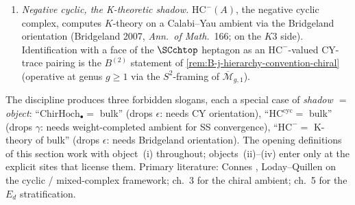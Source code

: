 \begin{remark}
\begin{enumerate}[label=\textup{(\roman*)}]
$=$ bulk is licensed only under the ambient declaration.
\item \emph{Negative cyclic, the K-theoretic shadow.}
$\mathrm{HC}^{-}(A)$, the negative cyclic complex, computes
$K$-theory on a Calabi--Yau ambient via the Bridgeland
orientation (Bridgeland 2007, \emph{Ann.\ of Math.}\ 166;
\cite{BM01} on the $K3$ side). Identification with a face of
the $\SCchtop$ heptagon as an $\mathrm{HC}^-$-valued CY-trace
pairing is the $B^{(2)}$ statement of
\cref{rem:B-j-hierarchy-convention-chiral} (operative at genus
$g \ge 1$ via the $S^2$-framing of
$\overline{\mathcal M}_{g,1}$).
\end{enumerate}
The discipline produces three forbidden slogans, each a special
case of \emph{shadow $=$ object}:
``$\mathrm{ChirHoch}_{\bullet} = $ bulk'' (drops $\epsilon$:
needs CY orientation),
``$\mathrm{HC}^{\mathrm{cyc}} = $ bulk'' (drops $\gamma$: needs
weight-completed ambient for SS convergence),
``$\mathrm{HC}^{-} = $ K-theory of bulk'' (drops $\epsilon$:
needs Bridgeland orientation). The opening definitions of this
section work with object~(i) throughout; objects~(ii)--(iv) enter
only at the explicit sites that license them. Primary literature:
Connes \cite{Con85}, Loday--Quillen \cite{LQ84} on the cyclic /
mixed-complex framework; \cite{BD04} ch.~3 for the chiral
ambient; \cite{HA} ch.~5 for the $E_d$ stratification.
\end{remark}

